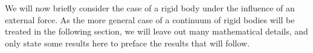 
We will now briefly consider the case of a rigid body under the influence of an external force. As the more general case of a continuum of rigid bodies will be treated in the following section, we will leave out many mathematical details, and only state some results here to preface the results that will follow.

